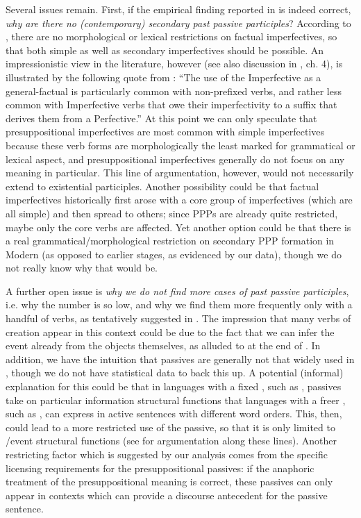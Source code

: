 \documentclass[output=paper,modfonts,newtxmath,hidelinks
\ChapterDOI{10.5281/zenodo.2545513}
]{langscibook}
\begin{document}
Several issues remain. First, if the empirical finding reported in  is indeed correct, \textit{why are there no (contemporary) secondary  past passive participles}? According to \citet{gronndiss}, there are no morphological or lexical restrictions on factual imperfectives, so that both simple as well as secondary imperfectives should be possible. An impressionistic view in the literature, however (see also discussion in \citealt{gronndiss}, ch. 4), is illustrated by the following quote from \citet[][118]{comrie76}: ``The use of the Imperfective as a general-factual is particularly common with non-prefixed verbs, and rather less common with Imperfective verbs that owe their imperfectivity to a suffix that derives them from a Perfective.'' At this point we can only speculate that presuppositional imperfectives are most common with simple imperfectives because these verb forms are morphologically the least marked for grammatical or lexical aspect, and presuppositional imperfectives  generally do not focus on any  meaning in particular. This line of argumentation, however, would not necessarily extend to existential  participles. Another possibility could be that factual imperfectives historically first arose with a core group of imperfectives (which are all simple) and then spread to others; since  PPPs are already quite restricted, maybe only the core verbs are affected. Yet another option could be that there is a real grammatical/morphological restriction on secondary  PPP formation in Modern  (as opposed to earlier stages, as evidenced by our data), though we do not really know why that would be.

A further open issue is \textit{why we do not find more cases of  past passive participles}, i.e. why the number is so low, and why we find them more frequently only with a handful of verbs, as tentatively suggested in . The impression that many verbs of creation appear in this context could be due to the fact that we can infer the event already from the objects themselves, as alluded to at the end of . In addition, we have the intuition that passives are generally not that widely used in , though we do not have statistical data to back this up. A potential (informal) explanation for this could be that in languages with a fixed , such as , passives take on particular information structural functions that languages with a freer , such as , can express in active sentences with different word orders. This, then, could lead to a more restricted use of the passive, so that it is only limited to /event structural functions (see \citealt{abraham06} for argumentation along these lines). Another restricting factor which is suggested by our analysis comes from the specific licensing requirements for the presuppositional  passives: if the anaphoric treatment of the presuppositional meaning is correct, these passives can only appear in contexts which can provide a discourse antecedent for the passive sentence.
\end{document}
